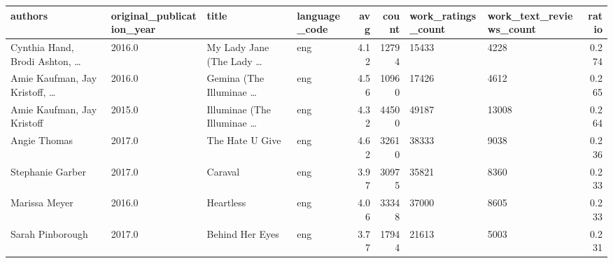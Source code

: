 \documentclass[11pt]{article}
\begin{document}
%        



\begin{table}
\begin{tabular}{lHlHrrHHr}
\toprule
                                  authors &  original\_publication\_year &                                      title & language\_code &  avg &  count &  work\_ratings\_count &  work\_text\_reviews\_count &  ratio \\
\midrule
 Cynthia Hand, Brodi Ashton, \ldots &                     2016.0 &         My Lady Jane (The Lady \ldots &           eng &            4.12 &          12794 &               15433 &                     4228 &       0.274 \\
     Amie Kaufman, Jay Kristoff, \ldots&                     2016.0 &           Gemina (The Illuminae \ldots &           eng &            4.56 &          10960 &               17426 &                     4612 &       0.265 \\
               Amie Kaufman, Jay Kristoff &                     2015.0 &        Illuminae (The Illuminae \ldots &           eng &            4.32 &          44500 &               49187 &                    13008 &       0.264 \\
                             Angie Thomas &                     2017.0 &                            The Hate U Give &           eng &            4.62 &          32610 &               38333 &                     9038 &       0.236 \\
                         Stephanie Garber &                     2017.0 &                                    Caraval &           eng &            3.97 &          30975 &               35821 &                     8360 &       0.233 \\
                            Marissa Meyer &                     2016.0 &                                  Heartless &           eng &            4.06 &          33348 &               37000 &                     8605 &       0.233 \\
                         Sarah Pinborough &                     2017.0 &                            Behind Her Eyes &           eng &            3.77 &          17944 &               21613 &                     5003 &       0.231 \\

\end{tabular}
\end{table}
\end{document}
